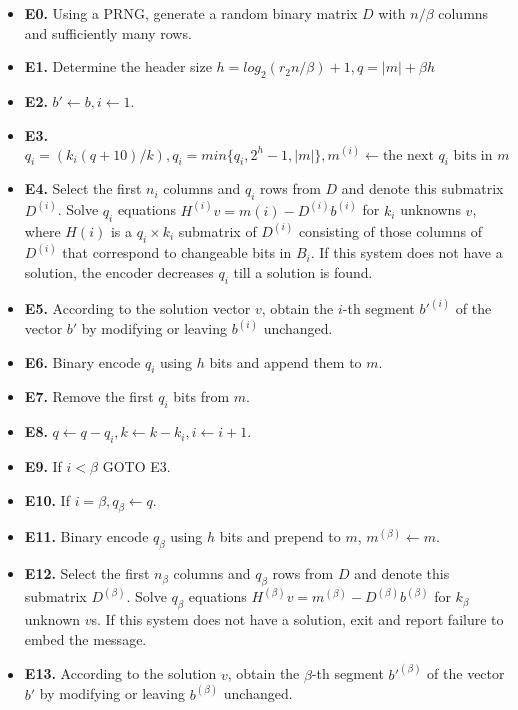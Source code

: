 \begin{itemize}
\item {\bf E0.} Using a PRNG, generate a random binary matrix $D$ with $n / \beta$
columns and sufficiently many rows.

\item {\bf E1.} Determine the header size $h=log_2(r_2 n /\beta)+1, q=|m|+ \beta h$

\item {\bf E2.} $b'\leftarrow b,i\leftarrow 1$.

\item {\bf E3.} $q_i=(k_i (q + 10)/k), q_i=min\{q_i,2^h-1,|m|\}, m^{(i)}\leftarrow \textrm{the next } q_i \textrm{ bits in } m$

\item {\bf E4.} Select the first $n_i$ columns and $q_i$ rows from $D$ and denote this submatrix $D^{(i)}$. Solve $q_i$ equations $H^{(i)}v=m(i) - D^{(i)}b^{(i)}$ for $k_i$ unknowns $v$, where $H(i)$ is a $q_i\times k_i$ submatrix of $D^{(i)}$ consisting of those columns of $D^{(i)}$ that correspond to changeable bits in $B_i$. If this system does not have a solution, the encoder decreases $q_i$ till a solution is found.

\item {\bf E5.} According to the solution vector $v$, obtain the $i$-th segment $b'^{(i)}$ of the vector $b'$ by modifying or leaving $b^{(i)}$ unchanged.

\item {\bf E6.} Binary encode $q_i$ using $h$ bits and append them to $m$.

\item {\bf E7.} Remove the first $q_i$ bits from $m$.

\item {\bf E8.} $q \leftarrow q - q_i, k \leftarrow k - k_i, i\leftarrow i+1$.

\item {\bf E9.} If $i < \beta$ GOTO E3.

\item {\bf E10.} If $i=\beta , q_\beta \leftarrow q$.

\item {\bf E11.} Binary encode $q_\beta$ using $h$ bits and prepend to $m$, $m^{(\beta)}\leftarrow m$.

\item {\bf E12.} Select the first $n_{\beta}$ columns and $q_{\beta}$ rows from $D$ and denote this submatrix $D^{(\beta)}$. Solve $q_{\beta}$ equations $H^{(\beta)}v=m^{(\beta)}-D^{(\beta)}b^{(\beta)}$ for $k_{\beta}$ unknown $v$s. If this system does not have a solution, exit and report failure to embed the message.

\item {\bf E13.} According to the solution $v$, obtain the $\beta$-th segment $b'^{(\beta)}$ of the vector $b'$ by modifying or leaving $b^{(\beta)}$ unchanged.

\end{itemize}

